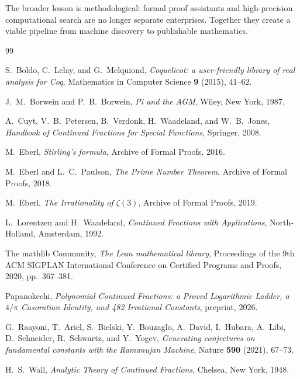 \documentclass[11pt,reqno]{amsart}
\theoremstyle{plain}
\theoremstyle{definition}
\theoremstyle{remark}
\begin{document}
The broader lesson is methodological: formal proof assistants and high-precision computational search are no longer separate enterprises.  Together they create a viable pipeline from machine discovery to publishable mathematics.

\begin{thebibliography}{99}

S.~Boldo, C.~Lelay, and G.~Melquiond,
\emph{Coquelicot: a user-friendly library of real analysis for Coq},
Mathematics in Computer Science \textbf{9} (2015), 41--62.

J.~M.~Borwein and P.~B.~Borwein,
\emph{Pi and the AGM},
Wiley, New York, 1987.

A.~Cuyt, V.~B.~Petersen, B.~Verdonk, H.~Waadeland, and W.~B.~Jones,
\emph{Handbook of Continued Fractions for Special Functions},
Springer, 2008.

M.~Eberl,
\emph{Stirling's formula},
Archive of Formal Proofs, 2016.

M.~Eberl and L.~C.~Paulson,
\emph{The Prime Number Theorem},
Archive of Formal Proofs, 2018.

M.~Eberl,
\emph{The Irrationality of $\zeta(3)$},
Archive of Formal Proofs, 2019.

L.~Lorentzen and H.~Waadeland,
\emph{Continued Fractions with Applications},
North-Holland, Amsterdam, 1992.

The mathlib Community,
\emph{The Lean mathematical library},
Proceedings of the 9th ACM SIGPLAN International Conference on Certified Programs and Proofs, 2020, pp.~367--381.

Papanokechi,
\emph{Polynomial Continued Fractions: a Proved Logarithmic Ladder, a $4/\pi$ Casoratian Identity, and 482 Irrational Constants},
preprint, 2026.

G.~Raayoni, T.~Ariel, S.~Bielski, Y.~Bouzaglo, A.~David, I.~Hubara,
A.~Libi, D.~Schneider, R.~Schwartz, and Y.~Yogev,
\emph{Generating conjectures on fundamental constants with the Ramanujan Machine},
Nature \textbf{590} (2021), 67--73.

H.~S.~Wall,
\emph{Analytic Theory of Continued Fractions},
Chelsea, New York, 1948.

\end{thebibliography}
\end{document}
